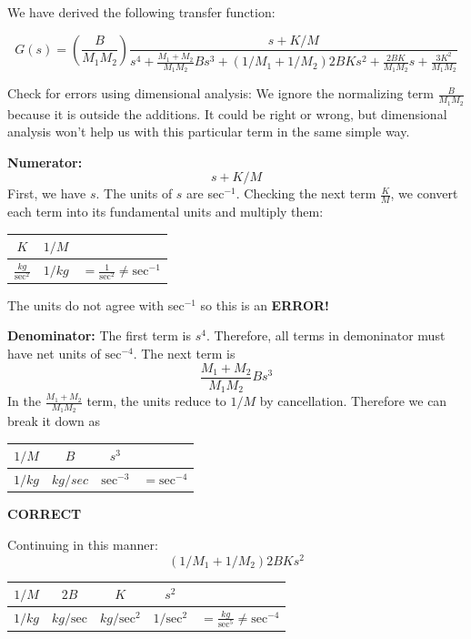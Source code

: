\begin{Example}\label{DimensionalAnalysisExample}

We have derived the following transfer function:

\[
G(s) = \left( \frac {B} {M_1M_2}\right) \frac{s+K/M}
 {s^4 + \frac{M_1+M_2}{M_1M_2}Bs^3+(1/M_1+1/M_2)2BKs^2+\frac{2BK}{M_1M_2}s+\frac{3K^2}{M_1M_2}}
\]

Check for errors using dimensional analysis:
We  ignore the normalizing term $\frac{B}{M_1M_2}$ because it is outside the additions.  It could be right or wrong, but
dimensional analysis won't help us with this particular term in the same simple way.


{\bf Numerator:}
\[
s+K/M
\]
First, we have $s$.  The units of $s$ are sec$^{-1}$.  Checking the next term $\frac{K}{M}$, we convert each term into its fundamental units and multiply them:

\begin{tabular}{c|c|c}
$K$ 	&	$1/M$  &	\\ \hline
$\frac{kg}{\mathrm{sec}^2}$ & $1/kg$ & $= \frac{1}{\mathrm{sec}^2} \neq \mathrm{sec}^{-1}$ \\
\end{tabular}

The units do not agree with sec$^{-1}$ so this is an \hspace{0.25in}  {\bf ERROR!}


\vspace{0.15in}

{\bf Denominator: }
\vspace{0.2in}
The first term is $s^4$.  Therefore, all terms in demoninator must have net units of $\mathrm{sec}^{-4}$.  The next term is
\[
\frac{M_1+M_2}{M_1M_2}Bs^3
\]
In the $\frac{M_1+M_2}{M_1M_2}$ term, the units reduce to $1/M$ by cancellation.   Therefore we can break it down as

\begin{tabular}{c|c|c|c}
$1/M$	& $B$      & $s^3$ & \\ \hline
$1/kg$  & $kg/sec$ & $\mathrm{sec}^{-3}$ & $= \mathrm{sec}^{-4}$
\end{tabular}
\hspace{0.25in}  {\bf CORRECT}



Continuing in this manner:
\[
(1/M_1+1/M_2)2BKs^2
\]

\begin{tabular}{c|c|c|c|c}
$1/M$	& $2B$	& $K$	& $s^2$ & \\ \hline
$1/kg$  & $kg/\mathrm{sec}$	& $kg/\mathrm{sec}^2$	& $1/\mathrm{sec}^2$	& $= \frac{kg}{\mathrm{sec}^5} \neq \mathrm{sec}^{-4}$
\end{tabular}
\hspace{0.25in}{\bf ERROR!}



\end{Example}
